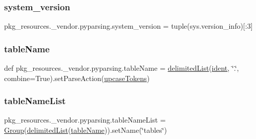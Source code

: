 \subsubsection{\texorpdfstring{system\+\_\+version}{system\_version}}
{\footnotesize\ttfamily pkg\+\_\+resources.\+\_\+vendor.\+pyparsing.\+system\+\_\+version = tuple(sys.\+version\+\_\+info)\mbox{[}\+:3\mbox{]}}

\mbox{\label{namespacepkg__resources_1_1__vendor_1_1pyparsing_a6be6bffbe7038f03b7c81903fcb8d3ae}} 
\subsubsection{\texorpdfstring{table\+Name}{tableName}}
{\footnotesize\ttfamily def pkg\+\_\+resources.\+\_\+vendor.\+pyparsing.\+table\+Name = \hyperlink{namespacepkg__resources_1_1__vendor_1_1pyparsing_aa689efbc59c6d46b1b9c16becee9f1b4}{delimited\+List}(\hyperlink{namespacepkg__resources_1_1__vendor_1_1pyparsing_adc450b5c4d8c48e0d83ab3fa195f00e0}{ident}, \char`\"{}.\char`\"{}, combine=True).set\+Parse\+Action(\hyperlink{namespacepkg__resources_1_1__vendor_1_1pyparsing_a43a04e1b2893f19ce7c95d93e11fbc39}{upcase\+Tokens})}

\mbox{\label{namespacepkg__resources_1_1__vendor_1_1pyparsing_ad65cab86fb975d963a5cb6f4adc24aa9}} 
\subsubsection{\texorpdfstring{table\+Name\+List}{tableNameList}}
{\footnotesize\ttfamily pkg\+\_\+resources.\+\_\+vendor.\+pyparsing.\+table\+Name\+List = \hyperlink{classpkg__resources_1_1__vendor_1_1pyparsing_1_1_group}{Group}(\hyperlink{namespacepkg__resources_1_1__vendor_1_1pyparsing_aa689efbc59c6d46b1b9c16becee9f1b4}{delimited\+List}(\hyperlink{namespacepkg__resources_1_1__vendor_1_1pyparsing_a6be6bffbe7038f03b7c81903fcb8d3ae}{table\+Name})).set\+Name(\char`\"{}tables\char`\"{})}


